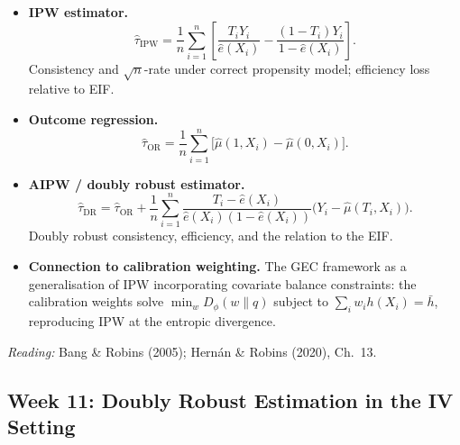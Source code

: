 \documentclass[12pt]{article}
\begin{document}
\begin{itemize}
  \item \textbf{IPW estimator.}
    \[
      \hat\tau_{\mathrm{IPW}} = \frac{1}{n}\sum_{i=1}^n \left[
        \frac{T_i Y_i}{\hat e(X_i)} - \frac{(1-T_i)Y_i}{1-\hat e(X_i)}
      \right].
    \]
    Consistency and $\sqrt{n}$-rate under correct propensity model;
    efficiency loss relative to EIF.

  \item \textbf{Outcome regression.}
    \[
      \hat\tau_{\mathrm{OR}} = \frac{1}{n}\sum_{i=1}^n
        \bigl[\hat\mu(1, X_i) - \hat\mu(0, X_i)\bigr].
    \]

  \item \textbf{AIPW / doubly robust estimator.}
    \[
      \hat\tau_{\mathrm{DR}} = \hat\tau_{\mathrm{OR}}
        + \frac{1}{n}\sum_{i=1}^n
          \frac{T_i - \hat e(X_i)}{\hat e(X_i)(1-\hat e(X_i))}
          \bigl(Y_i - \hat\mu(T_i, X_i)\bigr).
    \]
    Doubly robust consistency, efficiency, and the relation to the EIF.

  \item \textbf{Connection to calibration weighting.}
    The GEC framework as a generalisation of IPW incorporating
    covariate balance constraints: the calibration weights solve
    $\min_w D_\phi(w \| q)$ subject to $\sum_i w_i h(X_i) = \bar h$,
    reproducing IPW at the entropic divergence.
\end{itemize}

\noindent\textit{Reading:} Bang \& Robins (2005);
Hern\'an \& Robins (2020), Ch.~13.

\subsection{Week 11: Doubly Robust Estimation in the IV Setting}
\end{document}
